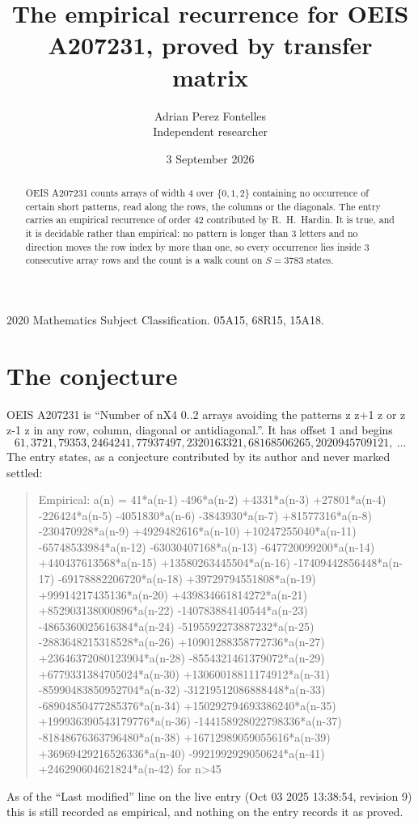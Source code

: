 \documentclass[11pt,a4paper]{article}
\title{The empirical recurrence for OEIS A207231, proved by transfer matrix}
\author{Adrian Perez Fontelles\\ \small Independent researcher}
\date{3 September 2026}
\theoremstyle{plain}
\theoremstyle{definition}
\begin{document}
\maketitle

\begin{abstract}
OEIS A207231 counts arrays of width $4$ over $\{0,1,2\}$ containing no occurrence of certain short
patterns, read along the rows, the columns or the diagonals. The entry carries an empirical
recurrence of order $42$ contributed by R.~H.~Hardin. It is true, and it is decidable
rather than empirical: no pattern is longer than $3$ letters and no direction moves the row
index by more than one, so every occurrence lies inside $3$ consecutive array rows and the
count is a walk count on $S=3783$ states.
\end{abstract}

\noindent\small 2020 Mathematics Subject Classification. 05A15, 68R15, 15A18.\normalsize

\section{The conjecture}

OEIS A207231 is ``Number of nX4 0..2 arrays avoiding the patterns z z+1 z or z z-1 z in any row, column, diagonal or antidiagonal.''. It has offset $1$ and begins
\[
61, 3721, 79353, 2464241, 77937497, 2320163321, 68168506265, 2020945709121,\ \dots
\]
The entry states, as a conjecture contributed by its author and never marked settled:
\begin{quote}
Empirical: a(n) = 41*a(n-1) -496*a(n-2) +4331*a(n-3) +27801*a(n-4) -226424*a(n-5) -4051830*a(n-6) -3843930*a(n-7) +81577316*a(n-8) -230470928*a(n-9) +4929482616*a(n-10) +10247255040*a(n-11) -65748533984*a(n-12) -63030407168*a(n-13) -647720099200*a(n-14) +440437613568*a(n-15) +13580263445504*a(n-16) -17409442856448*a(n-17) -69178882206720*a(n-18) +39729794551808*a(n-19) +99914217435136*a(n-20) +439834661814272*a(n-21) +852903138000896*a(n-22) -140783884140544*a(n-23) -4865360025616384*a(n-24) -5195592273887232*a(n-25) -2883648215318528*a(n-26) +10901288358772736*a(n-27) +23646372080123904*a(n-28) -8554321461379072*a(n-29) +6779331384705024*a(n-30) +13060018811174912*a(n-31) -85990483850952704*a(n-32) -31219512086888448*a(n-33) -68904850477285376*a(n-34) +150292794693386240*a(n-35) +199936390543179776*a(n-36) -144158928022798336*a(n-37) -81848676363796480*a(n-38) +16712989059055616*a(n-39) +36969429216526336*a(n-40) -9921992929050624*a(n-41) +246290604621824*a(n-42) for n>45
\end{quote}
As of the ``Last modified'' line on the live entry (Oct 03 2025 13:38:54, revision 9) this is still
recorded as empirical, and nothing on the entry records it as proved.
\end{document}
